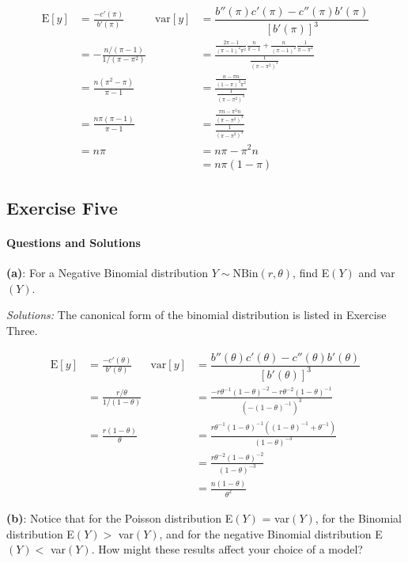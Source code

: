 \documentclass[]{article}
\let\oldparagraph\paragraph
\renewcommand{\paragraph}[1]{\oldparagraph{#1}\mbox{}}
\begin{document}
\begin{align*}
\text{E}[y] &= \frac{-c'(\pi)}{b'(\pi)} & \text{var}[y] &= \dfrac{b''(\pi)c'(\pi) - c''(\pi)b'(\pi)}{[b'(\pi)]^3}\\
&= -\frac{n/(\pi-1)}{1/(\pi - \pi^2)} & &= \frac{\frac{2\pi - 1}{(\pi-1)^2\pi^2}\frac{n}{\pi-1} + \frac{n}{(\pi-1)^2}\frac{1}{\pi-\pi^2}}{\frac{1}{(\pi - \pi^2)^3}}\\
&=  \frac{n(\pi^2 - \pi)}{\pi-1}      & &= \frac{\frac{n - \pi n}{(1 - \pi)^3\pi^2}}{\frac{1}{(\pi - \pi^2)^3}}\\
&= \frac{n\pi(\pi-1)}{\pi - 1}        & &= \frac{\frac{\pi n - \pi^2 n}{(\pi - \pi^2)^3}}{\frac{1}{(\pi - \pi^2)^3}}\\
&= n\pi                               & &= n\pi - \pi^2n\\
& & &= n\pi(1-\pi)
\end{align*}

\subsection{Exercise Five}\label{exercise-five}

\paragraph{Questions and Solutions}\label{questions-and-solutions}

\textbf{(a)}: For a Negative Binomial distribution
\(Y \sim \text{NBin}(r, \theta)\), find E\((Y)\) and var\((Y)\).

\emph{Solutions: } The canonical form of the binomial distribution is
listed in Exercise Three.

\begin{align*}
\text{E}[y] &= \frac{-c'(\theta)}{b'(\theta)} & \text{var}[y] &= \dfrac{b''(\theta)c'(\theta) - c''(\theta)b'(\theta)}{[b'(\theta)]^3}\\
&= \frac{r/\theta}{1/(1-\theta)} & &= \frac{-r\theta^{-1}(1-\theta)^{-2} - r\theta^{-2}(1-\theta)^{-1}}{(-(1-\theta)^{-1})^3}\\
&= \frac{r(1-\theta)}{\theta} & &= \frac{r\theta^{-1}(1-\theta)^{-1}((1-\theta)^{-1} + \theta^{-1})}{(1-\theta)^{-3}}\\
& & &= \frac{r\theta^{-2}(1-\theta)^{-2}}{(1-\theta)^{-3}}\\
& & &= \frac{n(1-\theta)}{\theta^2}
\end{align*}

\textbf{(b)}: Notice that for the Poisson distribution E\((Y)\) =
var\((Y)\), for the Binomial distribution E\((Y) >\) var\((Y)\), and for
the negative Binomial distribution E\((Y) <\) var\((Y)\). How might
these results affect your choice of a model?
\end{document}
